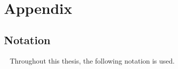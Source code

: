 \makeatletter %
\def\@makechapterhead#1{%
  \vspace*{20\p@}%
  {\parindent \z@ \raggedright
    \interlinepenalty\@M
    \LARGE \bfseries #1\par\nobreak
    \vspace*{40\p@}
  }}
\makeatother




\chapter{Appendix}





\section{Notation}~\label{appsec:notation}
Throughout this thesis, the following notation is used.
